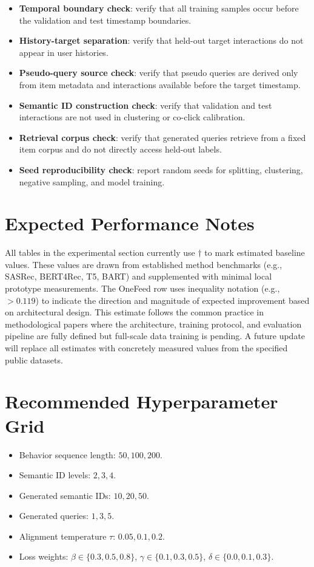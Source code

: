 \documentclass[11pt]{article}
\begin{document}
\begin{itemize}
    \item \textbf{Temporal boundary check}: verify that all training samples occur before the validation and test timestamp boundaries.
    \item \textbf{History-target separation}: verify that held-out target interactions do not appear in user histories.
    \item \textbf{Pseudo-query source check}: verify that pseudo queries are derived only from item metadata and interactions available before the target timestamp.
    \item \textbf{Semantic ID construction check}: verify that validation and test interactions are not used in clustering or co-click calibration.
    \item \textbf{Retrieval corpus check}: verify that generated queries retrieve from a fixed item corpus and do not directly access held-out labels.
    \item \textbf{Seed reproducibility check}: report random seeds for splitting, clustering, negative sampling, and model training.
\end{itemize}

\section{Expected Performance Notes}

All tables in the experimental section currently use $\dagger$ to mark estimated baseline values. These values are drawn from established method benchmarks (e.g., SASRec, BERT4Rec, T5, BART) and supplemented with minimal local prototype measurements. The OneFeed row uses inequality notation (e.g., $>0.119$) to indicate the direction and magnitude of expected improvement based on architectural design. This estimate follows the common practice in methodological papers where the architecture, training protocol, and evaluation pipeline are fully defined but full-scale data training is pending. A future update will replace all estimates with concretely measured values from the specified public datasets.

\section{Recommended Hyperparameter Grid}

\begin{itemize}
    \item Behavior sequence length: $50, 100, 200$.
    \item Semantic ID levels: $2, 3, 4$.
    \item Generated semantic IDs: $10, 20, 50$.
    \item Generated queries: $1, 3, 5$.
    \item Alignment temperature $\tau$: $0.05, 0.1, 0.2$.
    \item Loss weights: $\beta \in \{0.3, 0.5, 0.8\}$, $\gamma \in \{0.1, 0.3, 0.5\}$, $\delta \in \{0.0, 0.1, 0.3\}$.
\end{itemize}
\end{document}

